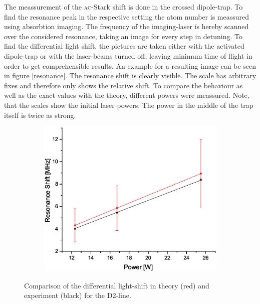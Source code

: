 The meassurement of the \textsc{ac}-Stark shift is done in the crossed dipole-trap. To find the resonance peak in the respective setting the atom number is meassured using absorbtion imaging. The frequency of the imaging-laser is hereby scanned over the considered resonance, taking an image for every step in detuning. To find the differential light shift, the pictures are taken either with the activated dipole-trap or with the laser-beams turned off, leaving minimum time of flight in order to get comprehensible results. An example for a resulting image can be seen in figure \ref{resonance}. The resonance shift is clearly visible. The scale has arbitrary fixes and therefore only shows the relative shift. To compare the behaviour as well as the exact values with the theory, different powers were meassured. Note, that the scales show the initial laser-powers. The power in the middle of the trap itself is twice as strong.

\begin{figure}[H]
\centering
\begin{subfigure}[b]{0.48\textwidth}
                \includegraphics[width=\textwidth]{Shift2}
\end{subfigure}
\caption{Comparison of the differential light-shift in theory (red) and experiment (black) for the D2-line.}
\label{shifts}
\end{figure}

